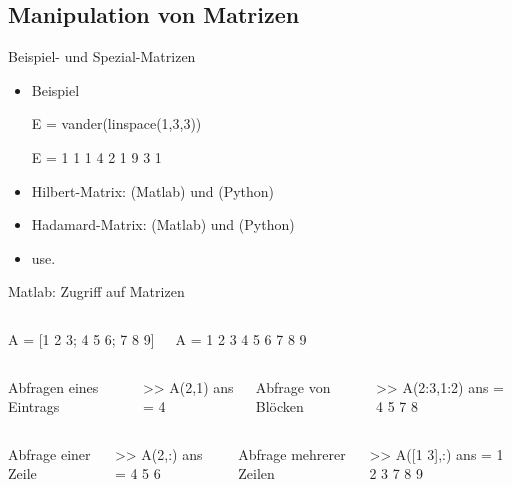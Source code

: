 \documentclass[hyperref={xetex}]{beamer}
\begin{document}
\subsection{Manipulation von Matrizen}
%
%
\begin{frame}[fragile]{Beispiel- und Spezial-Matrizen}
\begin{itemize}
\item Beispiel
\begin{matlabin}
E = vander(linspace(1,3,3))
\end{matlabin}
\begin{matlab}
E =
     1     1     1
     4     2     1
     9     3     1
\end{matlab}

\item Hilbert-Matrix: (Matlab) und (Python)
\item Hadamard-Matrix:  (Matlab) und (Python)
\item use.
\end{itemize}
\end{frame}
%
%
\begin{frame}[fragile]{Matlab: Zugriff auf Matrizen}
\begin{columns}[c]%
%
\begin{matlabin}[basicstyle=\tiny]
A = [1 2 3; 4 5 6; 7 8 9]
\end{matlabin}%
\begin{matlab}
A =
     1     2     3
     4     5     6
     7     8     9 
\end{matlab}%
\end{columns}%
\begin{columns}[t,onlytextwidth]
Abfragen eines Eintrags
\begin{matlabin}
>> A(2,1)
ans =
     4
\end{matlabin}
Abfrage von Blöcken
\begin{matlabin}
>> A(2:3,1:2)
ans =
     4     5     
     7     8     
\end{matlabin}
\end{columns}
\begin{columns}[t,onlytextwidth]
Abfrage einer Zeile
\begin{matlabin}
>> A(2,:)
ans =
     4     5     6
\end{matlabin}
Abfrage mehrerer Zeilen
\begin{matlabin}
>> A([1 3],:)
ans =
     1     2     3
     7     8     9
\end{matlabin}
\end{columns}
\end{frame}
\end{document}

